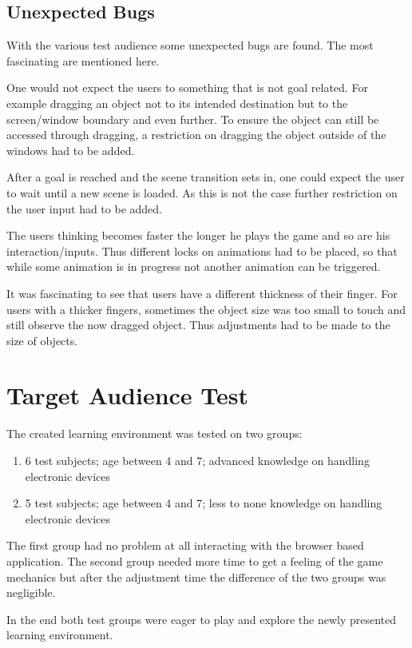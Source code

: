 \subsection{Unexpected Bugs}
With the various test audience some unexpected bugs are found. The most fascinating are mentioned here.

One would not expect the users to something that is not goal related.
For example dragging an object not to its intended destination but to the screen/window boundary and even further.
To ensure the object can still be accessed through dragging,
a restriction on dragging the object outside of the windows had to be added.

After a goal is reached and the scene transition sets in, one could expect the user to wait until a new scene is loaded.
As this is not the case further restriction on the user input had to be added.

The users thinking becomes faster the longer he plays the game and so are his interaction/inputs.
Thus different locks on animations had to be placed, so that while some animation is in progress not another animation can
be triggered.

It was fascinating to see that users have a different thickness of their finger.
For users with a thicker fingers, sometimes the object size was too small to touch and still observe the now dragged object.
Thus adjustments had to be made to the size of objects.

\section{Target Audience Test}
The created learning environment was tested on two groups:
\begin{enumerate}
    \item 6 test subjects; age between 4 and 7; advanced knowledge on handling electronic devices
    \item 5 test subjects; age between 4 and 7; less to none knowledge on handling electronic devices
\end{enumerate}

The first group had no problem at all interacting with the browser based application.
The second group needed more time to get a feeling of the game mechanics but after the adjustment time the difference of
the two groups was negligible.

In the end both test groups were eager to play and explore the newly presented learning environment.

